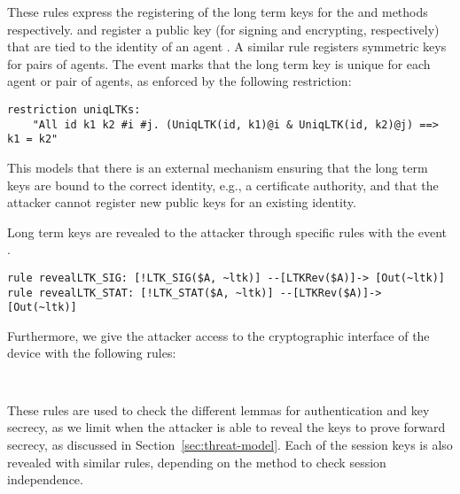 These rules express the registering of the long term keys for the \mSig and
\mStat{} methods respectively.
%
 and  register a public key (for
signing and encrypting, respectively) that are tied to the identity of an agent
. A similar rule  registers symmetric keys for pairs
of agents.
%
The event  marks that the long term key is unique for each
agent or pair of agents, as enforced by the following restriction:
\begin{lstlisting}
restriction uniqLTKs:
    "All id k1 k2 #i #j. (UniqLTK(id, k1)@i & UniqLTK(id, k2)@j) ==> k1 = k2"
\end{lstlisting}
This models that there is an external mechanism ensuring that the
long term keys are bound to the correct identity, e.g., a certificate authority,
and that the attacker cannot register new public keys for an existing identity.

Long term keys are revealed to the attacker through specific rules
with the event .
\begin{lstlisting}
rule revealLTK_SIG: [!LTK_SIG($A, ~ltk)] --[LTKRev($A)]-> [Out(~ltk)]
rule revealLTK_STAT: [!LTK_STAT($A, ~ltk)] --[LTKRev($A)]-> [Out(~ltk)]
\end{lstlisting}
Furthermore, we give the attacker access to the cryptographic interface of the
device with the following rules:
\begin{lstlisting}
  
\end{lstlisting}
These rules are used to check the different lemmas for authentication
and key secrecy, as we limit when the attacker is able to reveal the
keys to prove forward secrecy, as discussed in
Section~\ref{sec:threat-model}.
%
Each of the session keys is also revealed with similar rules,
depending on the method to check session independence.



